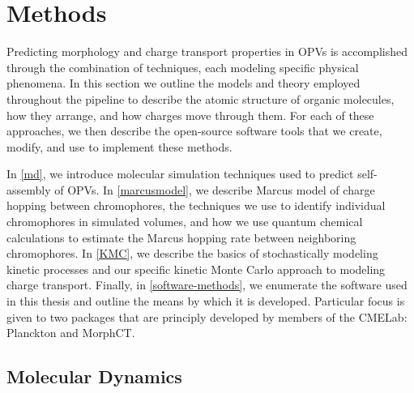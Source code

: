 \chapter{Methods}
\label{methods}

Predicting morphology and charge transport properties in OPVs is accomplished through the combination 
of techniques, each modeling specific physical phenomena.
In this section we outline the models and theory employed throughout the pipeline to describe 
the atomic structure of organic molecules, how they arrange, and how charges move through them. 
For each of these approaches, we then describe the open-source software tools that we create, modify, and use 
to implement these methods. 

In \autoref{md}, we introduce molecular simulation techniques used to predict self-assembly of OPVs.
In \autoref{marcusmodel}, we describe Marcus model of charge hopping between chromophores,
the techniques we use to identify individual chromophores in simulated volumes, 
and how we use quantum chemical calculations to estimate the Marcus hopping rate between
neighboring chromophores.
In \autoref{KMC}, we describe the basics of stochastically modeling kinetic processes and 
our specific kinetic Monte Carlo approach to modeling charge transport.
Finally, in \autoref{software-methods}, we enumerate the software used in this thesis and outline the means by
which it is developed. Particular focus is given to two packages that are principly developed by members of the CMELab:
Planckton and MorphCT.  
 

\section{Molecular Dynamics}

\label{md}

